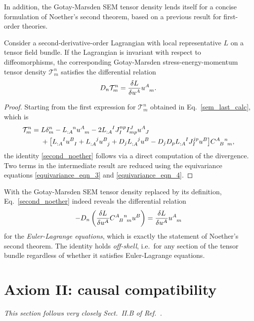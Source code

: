 In addition, the Gotay-Marsden SEM tensor density lends itself for a concise formulation of Noether's second theorem, based on a previous result \cite{Gotay_1992} for first-order theories.
\begin{theorem}\label{thm_second_noether}
  Consider a second-derivative-order Lagrangian with local representative $L$ on a tensor field bundle. If the Lagrangian is invariant with respect to diffeomorphisms, the corresponding Gotay-Marsden stress-energy-momentum tensor density $\mathcal T^n_m$ satisfies the differential relation
  \begin{equation}\label{second_noether}
    D_n \mathcal T^n_m = \frac{\delta L}{\delta u^A} u^A_{\hphantom Am}.
  \end{equation}
\end{theorem}
\begin{proof}
  Starting from the first expression for $\mathcal T^n_m$ obtained in Eq.\ \eqref{sem_last_calc}, which is
  \begin{equation}
    \begin{aligned}
      \mathcal T^n_m = {} & L\delta^n_m - L_{:A}^{\hphantom{:A}n}u^A_{\hphantom Am} - 2 L_{:A}^{\hphantom{:A}I}J_I^{np} I^J_{mp} u^A_{\hphantom AJ} \\
      {} & + \big\lbrack L_{:A}^{\hphantom{:A}I}u^B_{\hphantom BI} + L_{:A}^{\hphantom{:A}j}u^B_{\hphantom Bj} + D_j L_{:A}^{\hphantom{:A}j}u^B - D_j D_p L_{:A}^{\hphantom{:A}I}J_I^{jp} u^B \big\rbrack\gmc{A}{B}{n}{m},
    \end{aligned}
  \end{equation}
  the identity \eqref{second_noether} follows via a direct computation of the divergence. Two terms in the intermediate result are reduced using the equivariance equations \eqref{equivariance_eqn_3} and \eqref{equivariance_eqn_4}.
\end{proof}
With the Gotay-Marsden SEM tensor density replaced by its definition, Eq.\ \eqref{second_noether} indeed reveals the differential relation
\begin{equation}
  -D_n \left(\frac{\delta L}{\delta u^A}\gmc{A}{B}{n}{m}u^B\right) = \frac{\delta L}{\delta u^A} u^A_{\hphantom Am}
\end{equation}
for the \emph{Euler-Lagrange equations}, which is exactly the statement of Noether's second theorem. The identity holds \emph{off-shell}, i.e.\ for any section of the tensor bundle regardless of whether it satisfies Euler-Lagrange equations.

\section{Axiom II: causal compatibility}\label{sect_causal_compatibility}
\textit{This section follows very closely Sect.\ II.B of Ref.\ \cite{Alex_2020}.}


